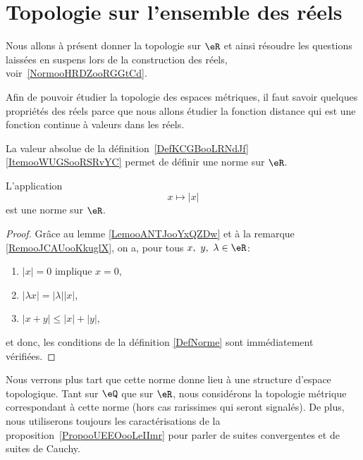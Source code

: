 
\section{Topologie sur l'ensemble des réels}
\label{SECooGKHYooMwHQaD}

Nous allons à présent donner la topologie sur \( \eR\) et ainsi résoudre les questions laissées en suspens lors de la construction des réels, voir~\ref{NormooHRDZooRGGtCd}.


Afin de pouvoir étudier la topologie des espaces métriques, il faut savoir quelques propriétés des réels parce que nous allons étudier la fonction distance qui est une fonction continue à valeurs dans les réels.

La valeur absolue de la définition~\ref{DefKCGBooLRNdJf}\ref{ItemooWUGSooRSRvYC} permet de définir une norme sur \( \eR\).
\begin{lemma}
    L'application
    \begin{equation}
         x\mapsto | x |
    \end{equation}
     est une norme sur $\eR$.
\end{lemma}

\begin{proof}
  Grâce au lemme \ref{LemooANTJooYxQZDw} et à la remarque \ref{RemooJCAUooKkuglX}, on a, pour tous \(x,\ y,\ \lambda \in \eR \):
\begin{enumerate}
\item $| x |=0$ implique $x=0$,
\item $| \lambda x |=| \lambda | |x |$,
\item $| x+y |\leq | x |+| y |$,
\end{enumerate}
et donc, les conditions de la définition \ref{DefNorme} sont immédiatement vérifiées.
\end{proof}

\begin{normaltext}      \label{ooLCMFooQjMaxV}
    Nous verrons plus tart que cette norme donne lieu à une structure d'espace topologique. Tant sur \( \eQ\) que sur \( \eR\), nous considérons la topologie métrique correspondant à cette norme (hors cas rarissimes qui seront signalés). De plus, nous utiliserons toujours les caractérisations de la proposition~\ref{PropooUEEOooLeIImr} pour parler de suites convergentes et de suites de Cauchy.
\end{normaltext}

